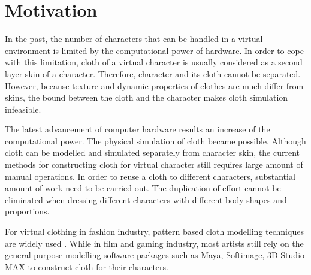 \section{Motivation}

In the past, the number of characters that can be handled in a virtual environment is limited by the computational power of hardware. In order to cope with this limitation, cloth of a virtual character is usually considered as a second layer skin of a character. Therefore, character and its cloth cannot be separated. However, because texture and dynamic properties of clothes are much differ from skins, the bound between the cloth and the character makes cloth simulation infeasible.



The latest advancement of computer hardware results an increase of the computational power. The physical simulation of cloth became possible. Although cloth can be modelled and simulated separately from character skin, the current methods for constructing cloth for virtual character still requires large amount of manual operations. In order to reuse a cloth to different characters, substantial amount of work need to be carried out. The duplication of effort cannot be eliminated when dressing different characters with different body shapes and proportions.


For virtual clothing in fashion industry, pattern based cloth modelling techniques are widely used . While in film and gaming industry, most artists still rely on the general-purpose modelling software packages such as Maya, Softimage, 3D Studio MAX to construct cloth for their characters.




